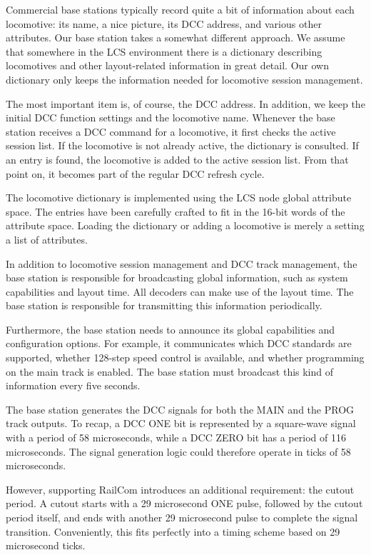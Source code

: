 Commercial base stations typically record quite a bit of information about each locomotive: its name, a nice picture, its DCC address, and various other attributes. Our base station takes a somewhat different approach. We assume that somewhere in the LCS environment there is a dictionary describing locomotives and other layout-related information in great detail. Our own dictionary only keeps the information needed for locomotive session management.

The most important item is, of course, the DCC address. In addition, we keep the initial DCC function settings and the locomotive name.
Whenever the base station receives a DCC command for a locomotive, it first checks the active session list. If the locomotive is not already active, the dictionary is consulted. If an entry is found, the locomotive is added to the active session list. From that point on, it becomes part of the regular DCC refresh cycle.

The locomotive dictionary is implemented using the LCS node global attribute space. The entries have been carefully crafted to fit in the 16-bit words of the attribute space. Loading the dictionary or adding a locomotive is merely a setting a list of attributes.


In addition to locomotive session management and DCC track management, the base station is responsible for broadcasting global information, such as system capabilities and layout time.
All decoders can make use of the layout time. The base station is responsible for transmitting this information periodically.

Furthermore, the base station needs to announce its global capabilities and configuration options. For example, it communicates which DCC standards are supported, whether 128-step speed control is available, and whether programming on the main track is enabled. The base station must broadcast this kind of information every five seconds.


The base station generates the DCC signals for both the MAIN and the PROG track outputs.
To recap, a DCC ONE bit is represented by a square-wave signal with a period of 58 microseconds, while a DCC ZERO bit has a period of 116 microseconds. The signal generation logic could therefore operate in ticks of 58 microseconds.

However, supporting RailCom introduces an additional requirement: the cutout period. A cutout starts with a 29 microsecond ONE pulse, followed by the cutout period itself, and ends with another 29 microsecond pulse to complete the signal transition. Conveniently, this fits perfectly into a timing scheme based on 29 microsecond ticks.

